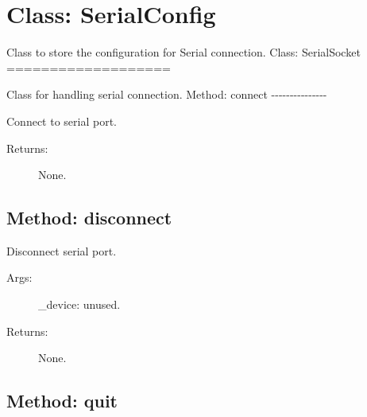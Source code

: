 %
%

\hypertarget{qconnectbase-serialclient-serial-base-class-serialconfig-56}{%
\section{Class: SerialConfig}\label{qconnectbase-serialclient-serial-base-class-serialconfig-56}}

\begin{Shaded}
\begin{Highlighting}[]
\end{Highlighting}
\end{Shaded}

Class to store the configuration for Serial connection. Class:
SerialSocket ===================

\begin{Shaded}
\begin{Highlighting}[]
\end{Highlighting}
\end{Shaded}

Class for handling serial connection. Method: connect
-\/-\/-\/-\/-\/-\/-\/-\/-\/-\/-\/-\/-\/-\/-

Connect to serial port.

\begin{description}
\item[Returns:]
None.
\end{description}

\hypertarget{qconnectbase-serialclient-serial-base-method-disconnect-57}{%
\subsection{Method: disconnect}\label{qconnectbase-serialclient-serial-base-method-disconnect-57}}

Disconnect serial port.

\begin{description}
\item[Args:]
\_device: unused.
\item[Returns:]
None.
\end{description}

\hypertarget{qconnectbase-serialclient-serial-base-method-quit-58}{%
\subsection{Method: quit}\label{qconnectbase-serialclient-serial-base-method-quit-58}}

